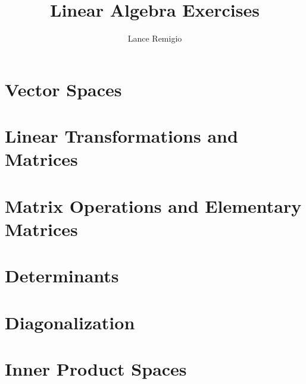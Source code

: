 \documentclass[11pt, a4paper]{book}
\title{Linear Algebra Exercises}
\author{Lance Remigio}
\begin{document}
\tableofcontents
\maketitle 

\chapter{Vector Spaces}











\chapter{Linear Transformations and Matrices}











\chapter{Matrix Operations and Elementary Matrices}



\chapter{Determinants}





\chapter{Diagonalization}





\chapter{Inner Product Spaces}










\end{document}

